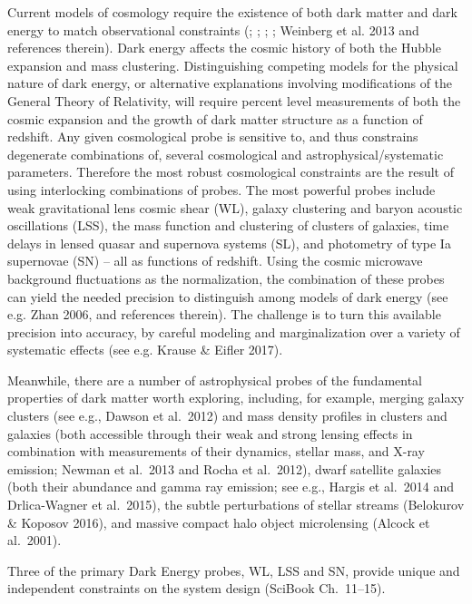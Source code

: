Current models of cosmology require the existence of both dark matter and dark
energy to match observational constraints (\cite{Riess2007}; \cite{Komatsu2009};
\cite{Percival2010}; \cite{LSSTDESC}; Weinberg et al. 2013 and references therein).
Dark energy affects the cosmic history of both the Hubble expansion
and mass clustering. Distinguishing competing models for the physical
nature of dark energy, or alternative explanations involving
modifications of the General Theory of Relativity, will require
percent level measurements of both the cosmic expansion and the growth
of dark matter structure as a function of redshift.  Any given
cosmological probe is sensitive to, and thus constrains degenerate
combinations of, several cosmological and astrophysical/systematic parameters.  Therefore the most robust
cosmological constraints are the result of using interlocking combinations
of probes. The most powerful probes include weak gravitational lens cosmic shear (WL), galaxy clustering and baryon
acoustic oscillations (LSS), the mass function and clustering of clusters of galaxies,
time delays in lensed quasar and supernova systems (SL),
and photometry of type Ia supernovae (SN) -- all as functions of
redshift. Using the cosmic microwave background fluctuations as the normalization, the
combination of these probes can yield the needed precision to distinguish among models of dark
energy (see e.g. Zhan 2006, and references therein). The challenge is to turn this available precision into accuracy, by careful modeling and marginalization over a variety of systematic effects (see e.g. Krause \& Eifler 2017).

Meanwhile, there are a number of astrophysical probes of the fundamental
properties of dark matter worth exploring, including, for example, merging
galaxy clusters (see e.g., Dawson et al.~2012) and mass density profiles in
clusters and galaxies (both accessible through their weak and strong lensing
effects in combination with measurements of their dynamics, stellar mass, and
X-ray emission; Newman et al.~2013 and Rocha et al.~2012), dwarf satellite
galaxies (both their abundance and gamma ray emission; see e.g., Hargis et
al.~2014 and Drlica-Wagner et al.~2015),  the subtle perturbations of stellar
streams (Belokurov \& Koposov 2016), and massive compact halo object
microlensing (Alcock et al.~2001).

Three of the primary Dark Energy probes, WL, LSS and SN,  provide unique and
independent constraints on the system design (SciBook Ch.~11--15).

